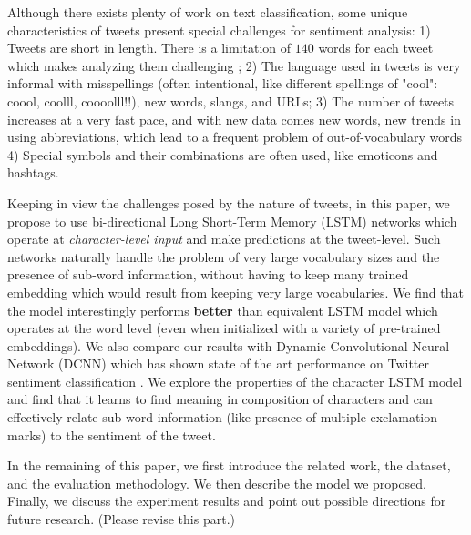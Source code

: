 \documentclass{article} %
\begin{document}
Although there exists plenty of work on text classification, some unique characteristics of tweets present special challenges for sentiment analysis:
1) Tweets are short in length. There is a limitation of $140$ words for each tweet which makes analyzing them challenging \cite{mehrotra2013improving}; 2) The language used in tweets is very informal with misspellings (often intentional, like different spellings of "cool": coool, coolll, coooolll!!), new words, slangs, and URLs;
3) The number of tweets increases at a very fast pace, and with new data comes new words, new trends in using abbreviations, which lead to a frequent problem of out-of-vocabulary words
4) Special symbols and their combinations are often used, like emoticons and hashtags.

Keeping in view the challenges posed by the nature of tweets, 
in this paper, we propose to use bi-directional Long Short-Term Memory (LSTM) 
networks which operate at {\it character-level input} and make predictions at the tweet-level. Such networks naturally handle the problem of very large vocabulary sizes and the presence of sub-word information, without having to keep many trained embedding which would result from keeping very large vocabularies.
We find that the model interestingly performs {\bf better} than equivalent LSTM model which operates at the word level (even when initialized with a variety of pre-trained embeddings).
We also compare our results with Dynamic Convolutional Neural Network (DCNN) \cite{kalchbrenner2014convolutional} which has shown state of the art performance on Twitter sentiment classification \cite{severynunitn}.
We explore the properties of the character LSTM model and find that it learns to find meaning in composition of characters and can effectively relate sub-word information (like presence of multiple exclamation marks) to the sentiment of the tweet.



In the remaining of this paper, we first introduce the related work, the dataset, and the evaluation methodology. We then describe the model we proposed. Finally, we discuss the experiment results and point out possible directions for future research. (Please revise this part.)
\end{document}
